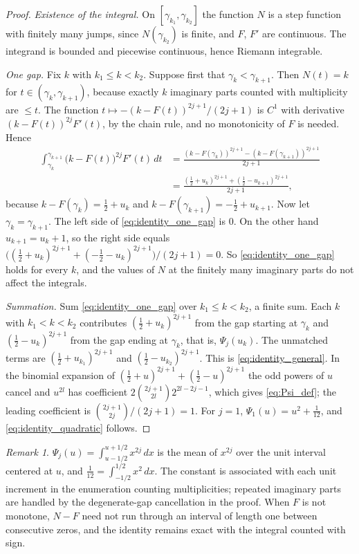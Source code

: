 \documentclass[11pt,a4paper]{article}
\makeatletter
\numberwithin{equation}{section}
\DeclareRobustCommand{\CGeqref}[1]{\eqref{#1}}
\let\CG@origeqref\eqref
\newcommand{\CG@gettip}[1]{\@ifundefined{CGTip@#1}{#1}{\csname CGTip@#1\endcsname}}
\DeclareRobustCommand{\CGeqref}[1]{\pdftooltip{\CG@origeqref{#1}}{\CG@gettip{#1}}}
\theoremstyle{definition}
\theoremstyle{remark}
\newtheorem{remark}[theorem]{Remark}
\makeatother
\begin{document}
\begin{proof}
\emph{Existence of the integral.} On $[\gamma_{k_1},\gamma_{k_2}]$ the function $N$ is a step function with finitely many jumps, since $N(\gamma_{k_2})$ is finite, and $F$, $F'$ are continuous. The integrand is bounded and piecewise continuous, hence Riemann integrable.

\emph{One gap.} Fix $k$ with $k_1\le k<k_2$. Suppose first that $\gamma_k<\gamma_{k+1}$. Then $N(t)=k$ for $t\in(\gamma_k,\gamma_{k+1})$, because exactly $k$ imaginary parts counted with multiplicity are $\le t$. The function $t\mapsto-(k-F(t))^{2j+1}/(2j+1)$ is $C^1$ with derivative $(k-F(t))^{2j}F'(t)$, by the chain rule, and no monotonicity of $F$ is needed. Hence
\begin{equation}
\begin{split}
\int_{\gamma_k}^{\gamma_{k+1}}\bigl(k-F(t)\bigr)^{2j}F'(t)\,dt&=\frac{(k-F(\gamma_k))^{2j+1}-(k-F(\gamma_{k+1}))^{2j+1}}{2j+1}\\
&=\frac{(\frac12+u_k)^{2j+1}+(\frac12-u_{k+1})^{2j+1}}{2j+1},
\end{split}
\label{eq:identity_one_gap}
\end{equation}
because $k-F(\gamma_k)=\frac12+u_k$ and $k-F(\gamma_{k+1})=-\frac12+u_{k+1}$. Now let $\gamma_k=\gamma_{k+1}$. The left side of \CGeqref{eq:identity_one_gap} is $0$. On the other hand $u_{k+1}=u_k+1$, so the right side equals $\bigl((\frac12+u_k)^{2j+1}+(-\frac12-u_k)^{2j+1}\bigr)/(2j+1)=0$. So \CGeqref{eq:identity_one_gap} holds for every $k$, and the values of $N$ at the finitely many imaginary parts do not affect the integrals.

\emph{Summation.} Sum \CGeqref{eq:identity_one_gap} over $k_1\le k<k_2$, a finite sum. Each $k$ with $k_1<k<k_2$ contributes $(\frac12+u_k)^{2j+1}$ from the gap starting at $\gamma_k$ and $(\frac12-u_k)^{2j+1}$ from the gap ending at $\gamma_k$, that is, $\Psi_j(u_k)$. The unmatched terms are $(\frac12+u_{k_1})^{2j+1}$ and $(\frac12-u_{k_2})^{2j+1}$. This is \CGeqref{eq:identity_general}. In the binomial expansion of $(\frac12+u)^{2j+1}+(\frac12-u)^{2j+1}$ the odd powers of $u$ cancel and $u^{2l}$ has coefficient $2\binom{2j+1}{2l}2^{2l-2j-1}$, which gives \CGeqref{eq:Psi_def}; the leading coefficient is $\binom{2j+1}{2j}/(2j+1)=1$. For $j=1$, $\Psi_1(u)=u^2+\frac1{12}$, and \CGeqref{eq:identity_quadratic} follows.
\end{proof}

\begin{remark}\label{rem:twelfth}
$\Psi_j(u)=\int_{u-1/2}^{u+1/2}x^{2j}\,dx$ is the mean of $x^{2j}$ over the unit interval centered at $u$, and $\frac1{12}=\int_{-1/2}^{1/2}x^2\,dx$. The constant is associated with each unit increment in the enumeration counting multiplicities; repeated imaginary parts are handled by the degenerate-gap cancellation in the proof. When $F$ is not monotone, $N-F$ need not run through an interval of length one between consecutive zeros, and the identity remains exact with the integral counted with sign.
\end{remark}
\end{document}
